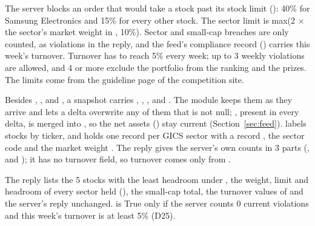 \seclabel
{}

 The server blocks an order that would take a stock past its stock limit (): 40\% for Samsung Electronics and 15\% for every other stock. The sector limit is max(2 $\times$ the sector's market weight in , 10\%). Sector and small-cap breaches are only counted, as violations in the  reply, and the feed's compliance record () carries this week's turnover. Turnover has to reach 5\% every week; up to 3 weekly violations are allowed, and 4 or more exclude the portfolio from the ranking and the prizes. The limits come from the guideline page of the competition site.

 Besides , ,  and , a snapshot carries , , ,  and . The  module keeps them as they arrive and lets a delta overwrite any of them that is not null; , present in every delta, is merged into , so the net assets () stay current (Section~\ref{sec:feed}).  labels stocks by ticker, and  holds one record per GICS sector with a record , the sector code  and the market weight . The  reply gives the server's own counts in 3 parts (,  and ); it has no turnover field, so turnover comes only from .



 The reply lists the 5 stocks with the least headroom under , the weight, limit and headroom of every sector held (), the small-cap total, the turnover values of  and the server's  reply unchanged.  is True only if the server counts 0 current violations and this week's turnover is at least 5\% (D25).


